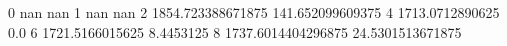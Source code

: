 0 nan nan
1 nan nan
2 1854.723388671875 141.652099609375
4 1713.0712890625 0.0
6 1721.5166015625 8.4453125
8 1737.6014404296875 24.5301513671875

